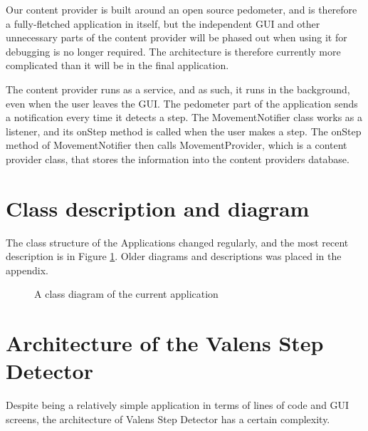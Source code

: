 Our content provider is built around an open source pedometer, and is therefore a fully-fletched application in itself, but the independent GUI and other unnecessary parts of the content provider will be phased out when using it for debugging is no longer required. The architecture is therefore currently more complicated than it will be in the final application.

The content provider runs as a service, and as such, it runs in the background, even when the user leaves the GUI. The pedometer part of the application sends a notification every time it detects a step. The MovementNotifier class works as a listener, and its onStep method is called when the user makes a step. The onStep method of MovementNotifier then calls MovementProvider, which is a content provider class, that stores the information into the content providers database.

\section{Class description and diagram}

The class structure of the Applications changed regularly, and the most recent description is in Figure \ref{fig:ClassDiagram}. Older diagrams and descriptions was placed in the appendix. 
\begin{figure}[p]
\label{fig:ClassDiagram}

\setlength\fboxsep{0pt}
\setlength\fboxrule{1pt}
\caption{A class diagram of the current application}
\end{figure}

\section{Architecture of the Valens Step Detector}

Despite being a relatively simple application in terms of lines of code and GUI screens, the architecture of Valens Step Detector has a certain complexity.





